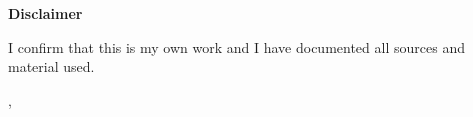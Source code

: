 \thispagestyle{empty}
\vspace*{\fill}
{\begin{center}
    \huge\textbf{Disclaimer}
\end{center}}
\vspace*{0.05\textheight}
\noindent
I confirm that this \MakeLowercase{\getDoctypeShort} is my own work and I have documented all sources and material used.

\vspace{15mm}

\noindent\getSubmissionLocation, \getSubmissionDateDisclaimer{}\hfill\getAuthor{}\hspace{1cm}

\vfill %
